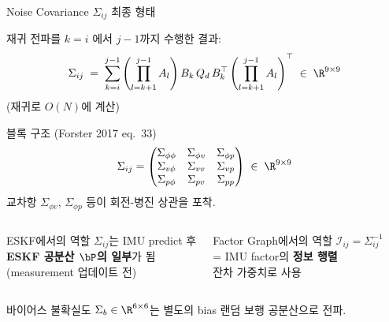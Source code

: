 \begin{frame}[shrink=10]{Noise Covariance $\Sigma_{ij}$ 최종 형태}

  재귀 전파를 $k = i$ 에서 $j-1$까지 수행한 결과:
  \[
    \Sigma_{ij} \;=\; \sum_{k=i}^{j-1}
      \left(\prod_{l=k+1}^{j-1}A_l\right)
      B_k\,Q_d\,B_k^\top
      \left(\prod_{l=k+1}^{j-1}A_l\right)^\top
    \;\in\;\R^{9\times 9}
  \]
  (재귀로 $O(N)$에 계산)

  \pause
  \begin{block}{블록 구조 (Forster 2017 eq.~33)}
    \[
      \Sigma_{ij} =
      \begin{pmatrix}
        \Sigma_{\phi\phi} & \Sigma_{\phi v} & \Sigma_{\phi p} \\
        \Sigma_{v\phi} & \Sigma_{vv} & \Sigma_{vp} \\
        \Sigma_{p\phi} & \Sigma_{pv} & \Sigma_{pp}
      \end{pmatrix}
      \;\in\;\R^{9\times 9}
    \]
    교차항 $\Sigma_{\phi v}$, $\Sigma_{\phi p}$ 등이 회전-병진 상관을 포착.
  \end{block}

  \pause
  \begin{columns}
    \begin{exampleblock}{ESKF에서의 역할}
      $\Sigma_{ij}$는 IMU predict 후\\
      \textbf{ESKF 공분산 $\bP$의 일부}가 됨\\
      (measurement 업데이트 전)
    \end{exampleblock}
    \begin{alertblock}{Factor Graph에서의 역할}
      $\mathcal{I}_{ij} = \Sigma_{ij}^{-1}$\\
      = IMU factor의 \textbf{정보 행렬}\\
      잔차 가중치로 사용
    \end{alertblock}
  \end{columns}

  \pause
  \vspace{0.2em}
  \footnotesize
  바이어스 불확실도 $\Sigma_b \in \R^{6\times 6}$는 별도의 bias 랜덤 보행 공분산으로 전파.
\end{frame}


